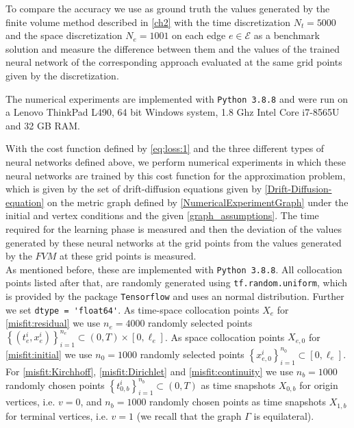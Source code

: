 To compare the accuracy we use as ground truth the values generated by the finite volume method described in \cref{ch2} with the time discretization $N_t = 5000$ and the space discretization $N_e = 1001$ on each edge $e \in \mathcal{E}$ as a benchmark solution and measure the difference between them and the values of the trained neural network of the corresponding approach evaluated at the same grid points given by the discretization. 

The numerical experiments are implemented with \lstinline!Python 3.8.8! and were run on a Lenovo ThinkPad L490, 64 bit Windows system, 1.8 Ghz Intel Core i7-8565U and 32 GB RAM.

With the cost function defined by \cref{eq:loss:1} and the three different types of neural networks defined above, we perform numerical experiments in which these neural networks are trained by this cost function for the approximation problem, which is given by the set of drift-diffusion equations given by \cref{Drift-Diffusion-equation} on the metric graph defined by \cref{NumericalExperimentGraph} under the initial and vertex conditions and the given \cref{graph_assumptions}. The time required for the learning phase is measured and then the deviation of the values generated by these neural networks at the grid points from the values generated by the $FVM$ at these grid points is measured. \\


As mentioned before, these are implemented with \lstinline!Python 3.8.8!. All collocation points listed after that, are randomly generated using \lstinline!tf.random.uniform!, which is provided by the package \lstinline!Tensorflow! and uses an normal distribution. Further we set \lstinline!dtype = 'float64'!. As time-space collocation points $X_e$ for \cref{misfit:residual} we use $n_e = 4000$ randomly selected points $\left\{ \left( t_e^i, x_e^i \right) \right\}_{i=1}^{n_e} \subset \left( 0, T \right) \times \left[0, \ell_e\right]$. As space collocation points $X_{e,0}$ for \cref{misfit:initial} we use $n_0 = 1000$ randomly selected points $ \left\{ x_{e,0}^i \right\}_{i=1}^{n_0} \subset \left[0, \ell_e\right]$. For \cref{misfit:Kirchhoff}, \cref{misfit:Dirichlet} and \cref{misfit:continuity} we use $n_b = 1000$ randomly chosen points $\left\{ t_{0,b}^i \right\}_{i=1}^{n_b} \subset \left( 0,T \right)$ as time snapshots $X_{0,b}$ for origin vertices, i.e. $v = 0$, and $n_b = 1000$ randomly chosen points as time snapshots $X_{1,b}$ for terminal vertices, i.e. $v = 1$ (we recall that the graph $\Gamma$ is equilateral). \\











